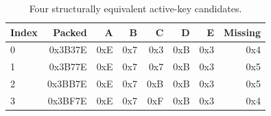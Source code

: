 \begin{table}[t]
\centering
\caption{Four structurally equivalent active-key candidates.}
\label{tab:s2-candidates}
\begin{tabular}{lrrrrrrr}
\toprule
Index & Packed & A & B & C & D & E & Missing \\
\midrule
0 & 0x3B37E & 0xE & 0x7 & 0x3 & 0xB & 0x3 & 0x4 \\
1 & 0x3B77E & 0xE & 0x7 & 0x7 & 0xB & 0x3 & 0x5 \\
2 & 0x3BB7E & 0xE & 0x7 & 0xB & 0xB & 0x3 & 0x5 \\
3 & 0x3BF7E & 0xE & 0x7 & 0xF & 0xB & 0x3 & 0x4 \\
\bottomrule
\end{tabular}
\end{table}
